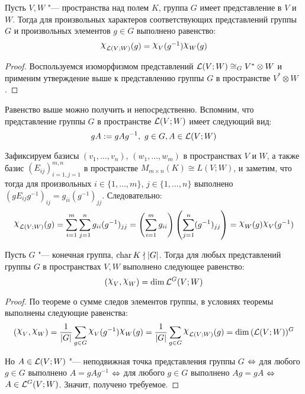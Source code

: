 \begin{corollary}
	Пусть $V, W$ "--- пространства над полем $K$, группа $G$ имеет представление в $V$ и $W$. Тогда для произвольных характеров соответствующих представлений группы $G$ и произвольных элементов $g \in G$ выполнено равенство:
	\[\Chi_{\mc L(V ; W)}(g) = \Chi_V(g^{-1})\Chi_W(g)\]
\end{corollary}

\begin{proof}
	Воспользуемся изоморфизмом представлений $\mathcal L(V; W) \cong_G V^* \otimes W$ и применим утверждение выше к представлению группы $G$ в пространстве $V^* \otimes W$.
\end{proof}

\begin{note}
	Равенство выше можно получить и непосредственно. Вспомним, что представление группы $G$ в пространстве $\mathcal L(V; W)$ имеет следующий вид:
	\[gA := gAg^{-1},~g \in G, A \in \mathcal L(V; W)\]
	
	Зафиксируем базисы $(v_1, \dotsc, v_n)$, $(w_1, \dotsc, w_m)$ в пространствах $V$ и $W$, а также базис $(E_{ij})_{i = 1, j = 1}^{m, n}$ в пространстве $M_{m \times n}(K) \cong L(V; W)$, и заметим, что тогда для произвольных $i \in \{1, \dotsc, m\}$, $j \in \{1, \dotsc, n\}$ выполнено $(gE_{ij}g^{-1})_{ij} = g_{ii}(g^{-1})_{jj}$. Следовательно:
	\[\Chi_{\mc L(V; W)}(g) = \sum_{i = 1}^{m}\sum_{j = 1}^{n}g_{ii}(g^{-1})_{jj} = \left(\sum_{i = 1}^{m}g_{ii}\right)\left(\sum_{j = 1}^{n}(g^{-1})_{jj}\right) = \Chi_W(g)\Chi_V(g^{-1})\]
\end{note}

\begin{theorem}
	Пусть $G$ "--- конечная группа, $\operatorname{char}{K} \nmid |G|$. Тогда для любых представлений группы $G$ в пространствах $V, W$ выполнено следующее равенство:
	\[(\Chi_{V}, \Chi_{W}) = \dim \mc L^G(V; W)\]
\end{theorem}

\begin{proof}
	По теореме о сумме следов элементов группы, в условиях теоремы выполнены следующие равенства:
	\[(\Chi_{V}, \Chi_{W}) = \frac1{|G|}\sum_{g \in G}\Chi_{V}(g^{-1})\Chi_{W}(g) = \frac1{|G|}\sum_{g \in G}\Chi_{\mc L(V; W)}(g) = \dim{(\mc L(V; W))^G}\]
	
	Но $A \in \mathcal L(V; W)$ "--- неподвижная точка представления группы $G$ $\Leftrightarrow$ для любого $g \in G$ выполнено $A = gAg^{-1}$ $\Leftrightarrow$ для любого $g \in G$ выполнено $Ag = gA$ $\Leftrightarrow$ $A \in \mathcal L^G(V; W)$. Значит, получено требуемое.
\end{proof}


